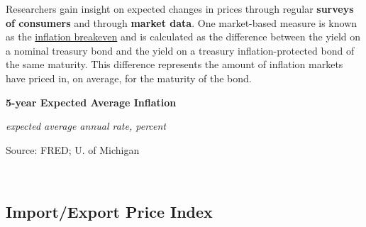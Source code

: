 \documentclass{report}
\makeatletter
\newcommand{\tbllink}[1]{\href{https://raw.githubusercontent.com/bdecon/US-chartbook/master/chartbook/data/#1}{\faTable}}
\newcommand*\short[1]{\expandafter\@gobbletwo\number\numexpr#1\relax}
\newcommand{\stdnode}[3]{\node[below, align=left, shift=({#1,#2})]{#3};}
\newcommand{\ltdateaxisticks}{
		date coordinates in=x, axis line style={draw=none},
		xmax={2020-09-01},
		max space between ticks=40,	    
		xtick={{2015-01-01}, {2016-01-01}, {2017-01-01}, {2018-01-01}, 
		    {2019-01-01}, {2020-01-01}},
		enlarge y limits={0.06}, enlarge x limits={0.01},
		}
\newcommand{\bbar}[2]{extra #1 ticks = {{#2}}, extra #1 tick labels = ,
		extra #1 tick style = {grid=major, grid style={thick, black!25}},}
\newcommand{\stdline}[4]{\addplot[very thick, no markers, color=#1] 
		table [x=#2, y=#3, col sep=comma] {#4};	}
\newcommand{\thinline}[4]{\addplot[no markers, color=#1] 
		table [x=#2, y=#3, col sep=comma] {#4};	}
\makeatother
\begin{document}
{{{{{{{{{\begin{minipage}{0.76\textwidth}

\small Researchers gain insight on expected changes in prices through regular \textbf{surveys of consumers} and through \textbf{market data}. One market-based measure is known as the \href{https://fred.stlouisfed.org/series/T5YIE}{inflation breakeven} and is calculated as the difference between the yield on a nominal treasury bond and the yield on a treasury inflation-protected bond of the same maturity. This difference represents the amount of inflation markets have priced in, on average, for the maturity of the bond.
\end{minipage}

\begin{minipage}{0.36\textwidth}
\normalsize \textbf{5-year Expected Average Inflation}

\footnotesize{\textit{expected average annual rate, percent}}

\hspace*{-2mm} 

\footnotesize{Source: FRED; U. of Michigan} \hfill \tbllink{infbreak.csv}
\end{minipage} \hspace{6mm} 
\begin{minipage}{0.35\textwidth}
\small \\


\end{minipage}

\newpage

\subsection*{\color{black!70} \seriffont Import/Export Price Index}

}}}}}}}}}
\end{document}
